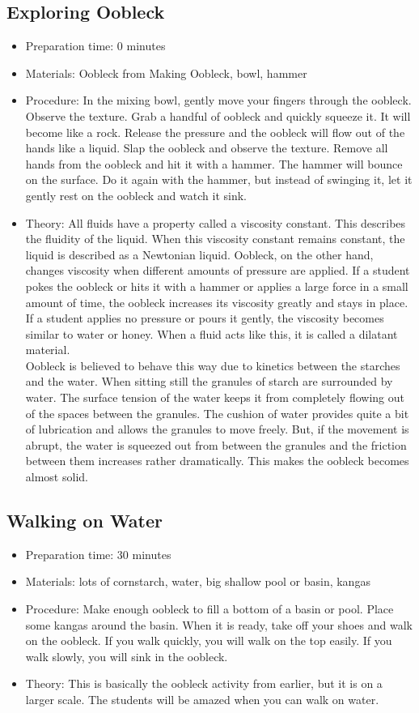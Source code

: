\subsection{Exploring Oobleck}
\begin{itemize}
\item{Preparation time: 0 minutes}
\item{Materials: Oobleck from Making Oobleck, bowl, hammer}
\item{Procedure: In the mixing bowl, gently move your fingers through the oobleck. Observe the texture. Grab a handful of oobleck and quickly squeeze it. It will become like a rock. Release the pressure and the oobleck will flow out of the hands like a liquid. Slap the oobleck and observe the texture. Remove all hands from the oobleck and hit it with a hammer. The hammer will bounce on the surface. Do it again with the hammer, but instead of swinging it, let it gently rest on the oobleck and watch it sink.}
\item{Theory: All fluids have a property called a viscosity constant. This describes the fluidity of the liquid. When this viscosity constant remains constant, the liquid is described as a Newtonian liquid. Oobleck, on the other hand, changes viscosity when different amounts of pressure are applied. If a student pokes the oobleck or hits it with a hammer or applies a large force in a small amount of time, the oobleck increases its viscosity greatly and stays in place. If a student applies no pressure or pours it gently, the viscosity becomes similar to water or honey. When a fluid acts like this, it is called a dilatant material.\\
Oobleck is believed to behave this way due to kinetics between the starches and the water. When sitting still the granules of starch are surrounded by water. The surface tension of the water keeps it from completely flowing out of the spaces between the granules. The cushion of water provides quite a bit of lubrication and allows the granules to move freely. But, if the movement is abrupt, the water is squeezed out from between the granules and the friction between them increases rather dramatically. This makes the oobleck becomes almost solid.}
\end{itemize}

\subsection{Walking on Water}
\begin{itemize}
\item{Preparation time: 30 minutes}
\item{Materials: lots of cornstarch, water, big shallow pool or basin, kangas}
\item{Procedure: Make enough oobleck to fill a bottom of a basin or pool. Place some kangas around the basin. When it is ready, take off your shoes and walk on the oobleck. If you walk quickly, you will walk on the top easily. If you walk slowly, you will sink in the oobleck.}
\item{Theory: This is basically the oobleck activity from earlier, but it is on a larger scale. The students will be amazed when you can walk on water.}
\end{itemize}

